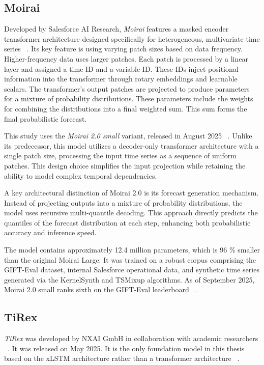 \subsection{Moirai}

Developed by Salesforce AI Research, \emph{Moirai} features a masked encoder transformer architecture designed specifically for heterogeneous, multivariate time series ~\cite{woo_unified_2024}.
Its key feature is using varying patch sizes based on data frequency. Higher-frequency data uses larger patches.
Each patch is processed by a linear layer and assigned a time ID and a variable ID.
These IDs inject positional information into the transformer through rotary embeddings and learnable scalars.
The transformer's output patches are projected to produce parameters for a mixture of probability distributions.
These parameters include the weights for combining the distributions into a final weighted sum.
This sum forms the final probabilistic forecast.

This study uses the \emph{Moirai 2.0 small} variant, released in August 2025 ~\cite{Salesforce_Moirai20}. 
Unlike its predecessor, this model utilizes a decoder-only transformer architecture with a single patch size, processing the input time series as a sequence of uniform patches. 
This design choice simplifies the input projection while retaining the ability to model complex temporal dependencies.

A key architectural distinction of Moirai 2.0 is its forecast generation mechanism.
Instead of projecting outputs into a mixture of probability distributions, the model uses recursive multi-quantile decoding.
This approach directly predicts the quantiles of the forecast distribution at each step, enhancing both probabilistic accuracy and inference speed.

The model contains approximately 12.4 million parameters, which is 96 \% smaller than the original Moirai Large.
It was trained on a robust corpus comprising the GIFT-Eval dataset, internal Salesforce operational data, and synthetic time series generated via the KernelSynth and TSMixup algorithms.
As of September 2025, Moirai 2.0 small ranks sixth on the GIFT-Eval leaderboard ~\cite{GIFT-Eval_Leaderboard}.

\subsection{TiRex}

\emph{TiRex} was developed by NXAI GmbH in collaboration with academic researchers ~\cite{auer_tirex_2025}. It was released on May 2025.
It is the only foundation model in this thesis based on the xLSTM architecture rather than a transformer architecture ~\cite{beck2024xlstm}.

